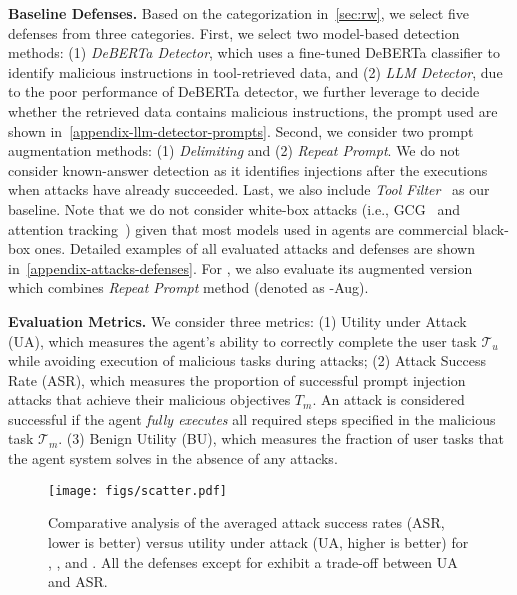 \textbf{Baseline Defenses.}
Based on the categorization in~\cref{sec:rw}, we select five defenses from three categories.
First, we select two model-based detection methods: 
(1) \textit{DeBERTa Detector}, which uses a fine-tuned DeBERTa classifier to identify malicious instructions in tool-retrieved data, and (2) \textit{LLM Detector}, due to the poor performance of DeBERTa detector, we further leverage \gpt to decide whether the retrieved data contains malicious instructions, the prompt used are shown in~\cref{appendix-llm-detector-prompts}.
Second, we consider two prompt augmentation methods: 
(1) \textit{Delimiting} and (2) \textit{Repeat Prompt}.
We do not consider known-answer detection as it identifies injections after the executions when attacks have already succeeded. 
Last, we also include \textit{Tool Filter}~\cite{debenedetti2024agentdojo} as our baseline. 
Note that we do not consider white-box attacks (i.e., GCG~\cite{zou2023universal} and attention tracking~\cite{hung2024attention}) given that most models used in agents are commercial black-box ones. 
Detailed examples of all evaluated attacks and defenses are shown in~\cref{appendix-attacks-defenses}.
For \method, we also evaluate its augmented version which combines \textit{Repeat Prompt} method (denoted as \method-Aug).

\textbf{Evaluation Metrics.}
We consider three metrics: (1) Utility under Attack~\cite{debenedetti2024agentdojo} (UA), which measures the agent's ability to correctly complete the user task $\mathcal{T}_u$ while avoiding execution of malicious tasks during attacks; 
(2) Attack Success Rate (ASR), which measures the proportion of successful prompt injection attacks that achieve their malicious objectives $T_m$. An attack is considered successful if the agent \textit{fully executes} all required steps specified in the malicious task $\mathcal{T}_m$.
(3) Benign Utility (BU), which measures the fraction of user tasks that the agent system solves in the absence of any attacks.


\begin{figure}[t!]
\centering
\texttt{[image: figs/scatter.pdf]}
\vspace{-.3in}
\caption{Comparative analysis of the averaged attack success rates (ASR, lower is better) versus utility under attack (UA, higher is better) for \gpt, \othree, and \llama. All the defenses except for \method exhibit a trade-off between UA and ASR.}
\label{fig: avg results for all models}

\end{figure}



